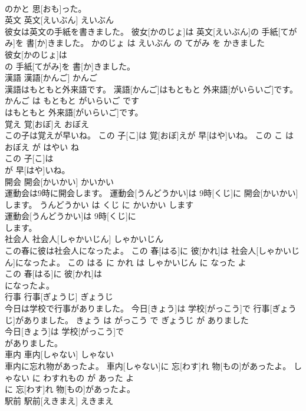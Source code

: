 \documentclass[8pt]{extreport}
\begin{document}
\begin{CJK}{UTF8}{min}
\\	のかと 思[おも]った。			
\\	英文	英文[えいぶん]	えいぶん	
\\	彼女は英文の手紙を書きました。	彼女[かのじょ]は 英文[えいぶん]の 手紙[てがみ]を 書[か]きました。	かのじょ は えいぶん の てがみ を かきました	
\\	彼女[かのじょ]は
\\	の 手紙[てがみ]を 書[か]きました。			
\\	漢語	漢語[かんご]	かんご	
\\	漢語はもともと外来語です。	漢語[かんご]はもともと 外来語[がいらいご]です。	かんご は もともと がいらいご です	
\\	はもともと 外来語[がいらいご]です。			
\\	覚え	覚[おぼ]え	おぼえ	
\\	この子は覚えが早いね。	この 子[こ]は 覚[おぼ]えが 早[はや]いね。	この こ は おぼえ が はやい ね	
\\	この 子[こ]は
\\	が 早[はや]いね。			
\\	開会	開会[かいかい]	かいかい	
\\	運動会は9時に開会します。	運動会[うんどうかい]は 9時[くじ]に 開会[かいかい]します。	うんどうかい は くじ に かいかい します	
\\	運動会[うんどうかい]は 9時[くじ]に
\\	します。			
\\	社会人	社会人[しゃかいじん]	しゃかいじん	
\\	この春に彼は社会人になったよ。	この 春[はる]に 彼[かれ]は 社会人[しゃかいじん]になったよ。	この はる に かれ は しゃかいじん に なった よ	
\\	この 春[はる]に 彼[かれ]は
\\	になったよ。			
\\	行事	行事[ぎょうじ]	ぎょうじ	
\\	今日は学校で行事がありました。	今日[きょう]は 学校[がっこう]で 行事[ぎょうじ]がありました。	きょう は がっこう で ぎょうじ が ありました	
\\	今日[きょう]は 学校[がっこう]で
\\	がありました。			
\\	車内	車内[しゃない]	しゃない	
\\	車内に忘れ物があったよ。	車内[しゃない]に 忘[わす]れ 物[もの]があったよ。	しゃない に わすれもの が あった よ	
\\	に 忘[わす]れ 物[もの]があったよ。			
\\	駅前	駅前[えきまえ]	えきまえ	

\end{CJK}
\end{document}
